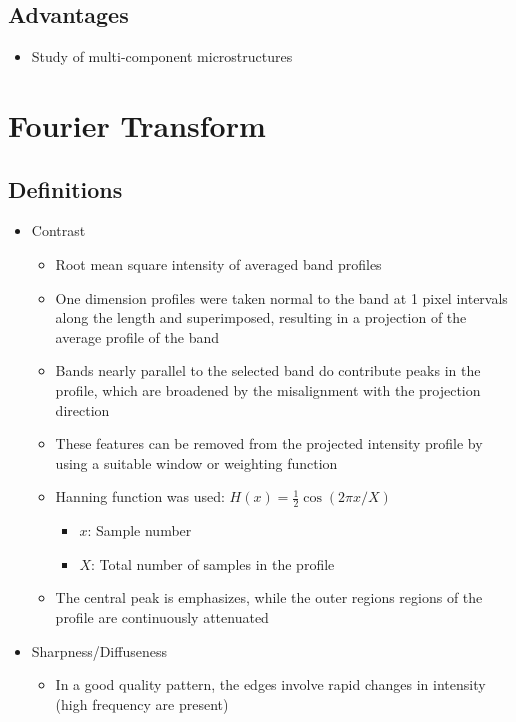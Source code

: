 \documentclass[letterpaper]{article}
\begin{document}
		\subsection{Advantages}
			\begin{itemize}
				\item Study of multi-component microstructures \cite{Wu2005}
			\end{itemize}
	
\newpage
	\section{Fourier Transform}
		\subsection{Definitions}
			\begin{itemize}
				\item Contrast \cite{Wilkinson1991}
					\begin{itemize}
						\item Root mean square intensity of averaged band profiles
						\item One dimension profiles were taken normal to the band at 1 pixel intervals along the length and superimposed, resulting in a projection of the average profile of the band
						\item Bands nearly parallel to the selected band do contribute peaks in the profile, which are broadened by the misalignment with the projection direction
						\item These features can be removed from the projected intensity profile by using a suitable window or weighting function
						\item Hanning function was used: $H(x) = \frac{1}{2}\cos{\left(2\pi x / X\right)}$
							\begin{itemize}
								\item $x$: Sample number
								\item $X$: Total number of samples in the profile
							\end{itemize}
						\item The central peak is emphasizes, while the outer regions regions of the profile are continuously attenuated
					\end{itemize}
				\item Sharpness/Diffuseness \cite{Wilkinson1991}
					\begin{itemize}
						\item In a good quality pattern, the edges involve rapid changes in intensity (high frequency are present)

\end{itemize}
\end{itemize}
\end{document}
